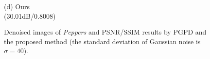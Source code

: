 \documentclass[runningheads]{llncs}
\begin{document}
\begin{figure}
{\begin{minipage}[t]{0.244\textwidth}
{\footnotesize (d) Ours \\(30.01dB/0.8008)}
\end{minipage}
}
\caption{Denoised images of \textsl{Peppers} and PSNR/SSIM results by PGPD and the proposed method (the standard deviation of Gaussian noise is $\sigma=40$).}
\label{fig24}
\end{figure}

\begin{figure}
\centering
{}
\end{figure}
\end{document}
